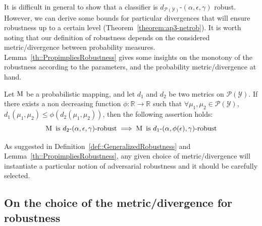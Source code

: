 \noindent
It is difficult in general to show that a classifier is $d_{\mathcal{P}(\mathcal{Y})}$-$(\alpha, \epsilon, \gamma)$ robust.
However, we can  derive some bounds for particular divergences that will ensure robustness up to a certain level (Theorem~\ref{theorem:ap3-netrob}).
It is worth noting that our definition of robustness depends on the considered metric/divergence between probability measures.
Lemma~\ref{th::PropimpliesRobustness} gives some insights on the monotony of the robustness according to the parameters, and the probability metric/divergence at hand.

\begin{lemma} \label{th::PropimpliesRobustness}
  Let $\operatorname*{M}$ be a probabilistic mapping, and let  $d_{1}$ and $d_{2}$ be two metrics on $\mathcal{P}(\mathcal{Y})$.
  If there exists a non decreasing function $ \phi: \mathbb{R} \to \mathbb{R}$ such that $\forall \mu_1,\mu_2 \in \mathcal{P}(\mathcal{Y})$, $d_{1}(\mu_1,\mu_2) \leq \phi(d_{2}(\mu_1,\mu_2)) $, then the following assertion holds: 
  \begin{equation}
    \operatorname*{M} \text{ is } d_{2}\text{-}(\alpha, \epsilon, \gamma)\text{-robust} \implies \operatorname*{M} \text{ is }d_{1}\text{-}(\alpha, \phi(\epsilon), \gamma)\text{-robust}
  \end{equation}
  \removespace
\end{lemma}
\noindent
As suggested in Definition~\ref{def::GeneralizedRobustness} and Lemma~\ref{th::PropimpliesRobustness}, any given choice of metric/divergence will instantiate a particular notion of adversarial robustness and it should be carefully selected. 

\subsection{On the choice of the metric/divergence for robustness}
\label{subsec:div}

